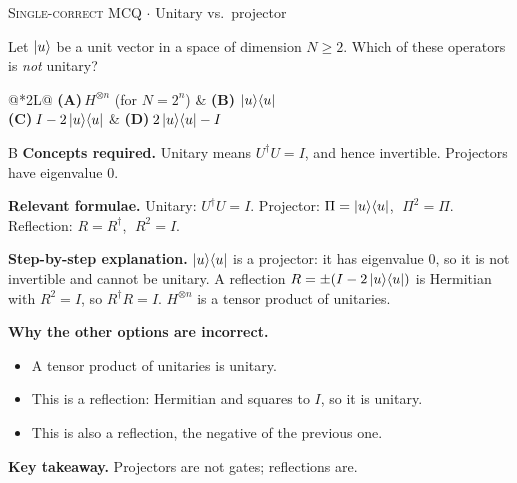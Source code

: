 \documentclass[11pt,a4paper]{article}
\newcommand{\optlabel}[1]{\textbf{(#1)}}
\newcommand{\correctlabel}[1]{\textcolor{okgreen}{\textbf{(#1)}\,\ding{51}}}
\newenvironment{qitem}[1]{\begin{list}{}{\setlength{\leftmargin}{3.3em}\setlength{\labelwidth}{3.1em}%
  \setlength{\labelsep}{0.2em}\setlength{\topsep}{3pt}\setlength{\parsep}{3pt}}\item[\textbf{Q.#1}\hfill]}{\end{list}}
\newcommand{\qsep}{\par\vspace{2pt}{\color{black!15}\hrule}\vspace{4pt}}
\newcommand{\qmeta}[2]{{\footnotesize\color{black!60}\textsc{#1} \;$\cdot$\; #2}\par}
\begin{document}
\begin{qitem}{30}
\qmeta{Single-correct MCQ}{Unitary vs.\ projector}
Let $\ket{u}$ be a unit vector in a space of dimension $N \ge 2$. Which of these operators is \emph{not} unitary?
\par\smallskip\noindent\begin{tabularx}{\linewidth}{@{}*{2}{L}@{}}
\optlabel{A}\,$H^{\otimes n}$ (for $N = 2^n$) & \correctlabel{B}\,$\ket{u}\!\bra{u}$ \\[3pt]
\optlabel{C}\,$I - 2\ket{u}\!\bra{u}$ & \optlabel{D}\,$2\ket{u}\!\bra{u} - I$
\end{tabularx}
\end{qitem}
\begin{solbox}{B}
\textbf{\color{brand}Concepts required.} Unitary means $U^\dagger U = I$, and hence invertible. Projectors have eigenvalue $0$.

\textbf{\color{brand}Relevant formulae.} Unitary: $U^\dagger U = I$. Projector: $\Pi = \ket{u}\!\bra{u}$, $\;\Pi^2 = \Pi$. Reflection: $R = R^\dagger$, $\;R^2 = I$.

\textbf{\color{brand}Step-by-step explanation.} $\ket{u}\!\bra{u}$ is a projector: it has eigenvalue $0$, so it is not invertible and cannot be unitary. A reflection $R = \pm(I - 2\ket{u}\!\bra{u})$ is
Hermitian with $R^2 = I$, so $R^\dagger R = I$. $H^{\otimes n}$ is a tensor product of unitaries.

\textbf{\color{brand}Why the other options are incorrect.}
\begin{itemize}[leftmargin=2.4em, itemsep=1pt, topsep=2pt]
\item[\textbf{(A)}] A tensor product of unitaries is unitary.
\item[\textbf{(C)}] This is a reflection: Hermitian and squares to $I$, so it is unitary.
\item[\textbf{(D)}] This is also a reflection, the negative of the previous one.
\end{itemize}
\textbf{\color{brand}Key takeaway.} Projectors are not gates; reflections are.
\end{solbox}
\qsep
\end{document}
